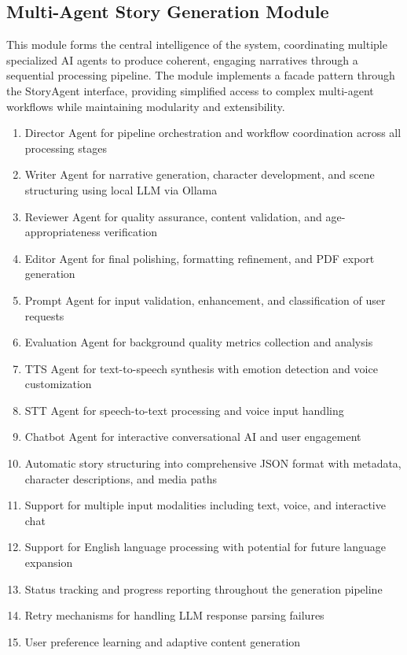 \subsection{Multi-Agent Story Generation Module}
This module forms the central intelligence of the system, coordinating multiple specialized AI agents to produce coherent, engaging narratives through a sequential processing pipeline. The module implements a facade pattern through the StoryAgent interface, providing simplified access to complex multi-agent workflows while maintaining modularity and extensibility.
\begin{enumerate}
    \item Director Agent for pipeline orchestration and workflow coordination across all processing stages
    \item Writer Agent for narrative generation, character development, and scene structuring using local LLM via Ollama
    \item Reviewer Agent for quality assurance, content validation, and age-appropriateness verification
    \item Editor Agent for final polishing, formatting refinement, and PDF export generation
    \item Prompt Agent for input validation, enhancement, and classification of user requests
    \item Evaluation Agent for background quality metrics collection and analysis
    \item TTS Agent for text-to-speech synthesis with emotion detection and voice customization
    \item STT Agent for speech-to-text processing and voice input handling
    \item Chatbot Agent for interactive conversational AI and user engagement
    \item Automatic story structuring into comprehensive JSON format with metadata, character descriptions, and media paths
    \item Support for multiple input modalities including text, voice, and interactive chat
    \item Support for English language processing with potential for future language expansion
    \item Status tracking and progress reporting throughout the generation pipeline
    \item Retry mechanisms for handling LLM response parsing failures
    \item User preference learning and adaptive content generation
\end{enumerate}

